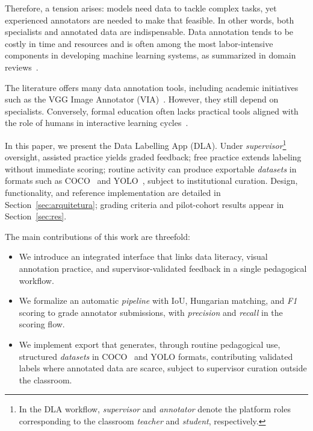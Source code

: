 \documentclass[runningheads]{llncs}
\begin{document}
Therefore, a tension arises: models need data to tackle complex tasks, yet experienced annotators are needed to make that feasible. In other words, both specialists and annotated data are indispensable. Data annotation tends to be costly in time and resources and is often among the most labor-intensive components in developing machine learning systems, as summarized in domain reviews~\cite{willemink2020preparing}.

The literature offers many data annotation tools, including academic initiatives such as the VGG Image Annotator (VIA)~\cite{dutta2019via}. However, they still depend on specialists. Conversely, formal education often lacks practical tools aligned with the role of humans in interactive learning cycles~\cite{amershi2014power}.

In this paper, we present the Data Labelling App (DLA). Under \emph{supervisor}\footnote{In the DLA workflow, \emph{supervisor} and \emph{annotator} denote the platform roles corresponding to the classroom \emph{teacher} and \emph{student}, respectively.} oversight, assisted practice yields graded feedback; free practice extends labeling without immediate scoring; routine activity can produce exportable \textit{datasets} in formats such as COCO~\cite{lin2014microsoft} and YOLO~\cite{ultralytics}, subject to institutional curation. Design, functionality, and reference implementation are detailed in Section~\ref{sec:arquitetura}; grading criteria and pilot-cohort results appear in Section~\ref{sec:res}.

The main contributions of this work are threefold:
\begin{itemize}
    \item We introduce an integrated interface that links data literacy, visual annotation practice, and supervisor-validated feedback in a single pedagogical workflow.
    \item We formalize an automatic \textit{pipeline} with IoU, Hungarian matching, and \emph{F1} scoring to grade annotator submissions, with \emph{precision} and \emph{recall} in the scoring flow.
    \item We implement export that generates, through routine pedagogical use, structured \textit{datasets} in {COCO}~\cite{lin2014microsoft} and {YOLO} formats, contributing validated labels where annotated data are scarce, subject to supervisor curation outside the classroom.
\end{itemize}
\end{document}
